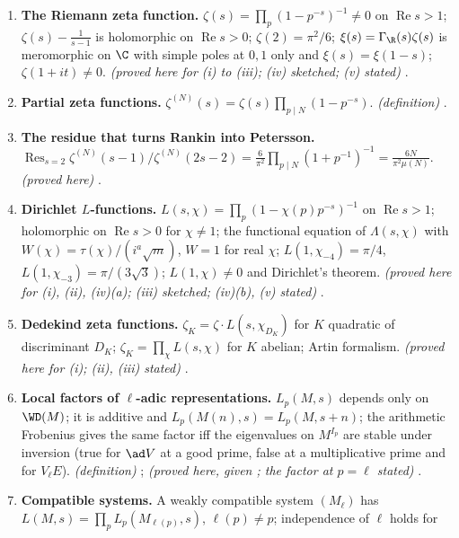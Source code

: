 \begin{enumerate}[label=\textbf{\thechapter.\arabic*}]
$\int_0^\infty\sum a_ne^{-2\pi ny}y^{s-1}dy=(2\pi)^{-s}\Gamma(s)\sum a_nn^{-s}$ for $a_n=O(n^c)$, $\operatorname{Re}s>c+1$. \emph{(proved here; duplication formula stated)}
.
\item \textbf{The Riemann zeta function.} $\zeta(s)=\prod_p(1-p^{-s})^{-1}\ne0$ on $\operatorname{Re}s>1$; $\zeta(s)-\frac1{s-1}$ is holomorphic on $\operatorname{Re}s>0$;
$\zeta(2)=\pi^2/6$; $\xi(s)=\Gamma_\R(s)\zeta(s)$ is meromorphic on $\C$ with simple poles at $0,1$ only and $\xi(s)=\xi(1-s)$; $\zeta(1+it)\ne0$. \emph{(proved here for
(i) to (iii); (iv) sketched; (v) stated)} .
\item \textbf{Partial zeta functions.} $\zeta^{(N)}(s)=\zeta(s)\prod_{p\mid N}(1-p^{-s})$. \emph{(definition)} .
\item \textbf{The residue that turns Rankin into Petersson.} $\operatorname{Res}_{s=2}\zeta^{(N)}(s-1)/\zeta^{(N)}(2s-2)=\frac6{\pi^2}\prod_{p\mid N}(1+p^{-1})^{-1}=\frac{6N}{\pi^2\mu(N)}$.
\emph{(proved here)} .
\item \textbf{Dirichlet $L$-functions.} $L(s,\chi)=\prod_p(1-\chi(p)p^{-s})^{-1}$ on $\operatorname{Re}s>1$; holomorphic on $\operatorname{Re}s>0$ for $\chi\ne1$; the functional
equation of $\Lambda(s,\chi)$ with $W(\chi)=\tau(\chi)/(i^a\sqrt m)$, $W=1$ for real $\chi$; $L(1,\chi_{-4})=\pi/4$, $L(1,\chi_{-3})=\pi/(3\sqrt3)$; $L(1,\chi)\ne0$ and
Dirichlet's theorem. \emph{(proved here for (i), (ii), (iv)(a); (iii) sketched; (iv)(b), (v) stated)} .
\item \textbf{Dedekind zeta functions.} $\zeta_K=\zeta\cdot L(s,\chi_{D_K})$ for $K$ quadratic of discriminant $D_K$; $\zeta_K=\prod_\chi L(s,\chi)$ for $K$ abelian;
Artin formalism. \emph{(proved here for (i); (ii), (iii) stated)} .
\item \textbf{Local factors of $\ell$-adic representations.} $L_p(M,s)$ depends only on $\WD(M)$; it is additive and $L_p(M(n),s)=L_p(M,s+n)$; the arithmetic
Frobenius gives the same factor iff the eigenvalues on $M^{I_p}$ are stable under inversion (true for $\ad V$ at a good prime, false at a
multiplicative prime and for $V_\ell E$). \emph{(definition)} ; \emph{(proved here, given ; the factor at
$p=\ell$ stated)} .
\item \textbf{Compatible systems.} A weakly compatible system $(M_\ell)$ has $L(M,s)=\prod_pL_p(M_{\ell(p)},s)$, $\ell(p)\ne p$; independence of $\ell$ holds for

\end{enumerate}
